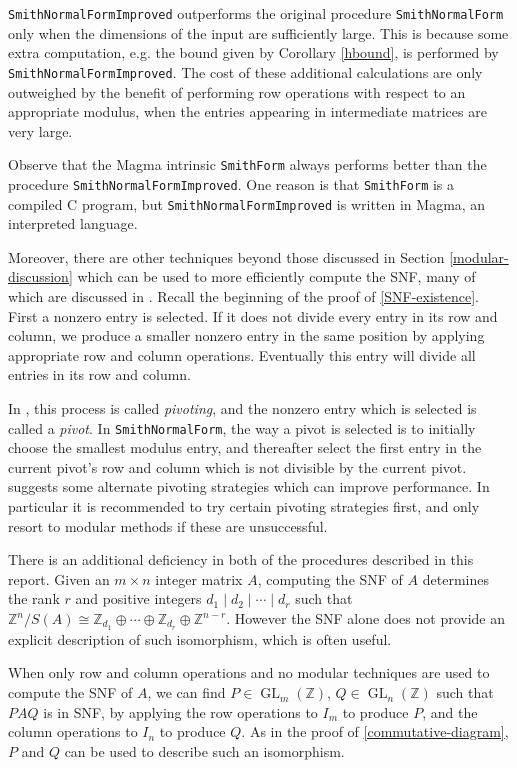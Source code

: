 \documentclass[12pt,a4paper,answers]{exam}
\newcommand{\Z}{\mathbb{Z}}
\DeclareMathOperator{\GL}{GL}
\theoremstyle{definition}
\begin{document}
\texttt{SmithNormalFormImproved} outperforms the original procedure \texttt{SmithNormalForm} only when the dimensions of the input are sufficiently large. This is because some extra computation, e.g. the bound given by Corollary \ref{hbound}, is performed by \texttt{SmithNormalFormImproved}. The cost of these additional calculations are only outweighed by the benefit of performing row operations with respect to an appropriate modulus, when the entries appearing in intermediate matrices are very large.

Observe that the {\sc Magma} intrinsic \texttt{SmithForm} always performs better than the procedure \texttt{SmithNormalFormImproved}. One reason is that \texttt{SmithForm} is a compiled C program, but \texttt{SmithNormalFormImproved} is written in {\sc Magma}, an interpreted language.

Moreover, there are other techniques beyond those discussed in Section \ref{modular-discussion} which can be used to more efficiently compute the SNF, many of which are discussed in \cite{havas}. Recall the beginning of the proof of \autoref{SNF-existence}. First a nonzero entry is selected. If it does not divide every entry in its row and column, we produce a smaller nonzero entry in the same position by applying appropriate row and column operations. Eventually this entry will divide all entries in its row and column.

In \cite{havas}, this process is called \emph{pivoting}, and the nonzero entry which is selected is called a \emph{pivot}. In \texttt{SmithNormalForm}, the way a pivot is selected is to initially choose the smallest modulus entry, and thereafter select the first entry in the current pivot's row and column which is not divisible by the current pivot. \cite{havas} suggests some alternate pivoting strategies which can improve performance. In particular it is recommended to try certain pivoting strategies first, and only resort to modular methods if these are unsuccessful.

There is an additional deficiency in both of the procedures described in this report. Given an $m\times n$ integer matrix $A$, computing the SNF of $A$ determines the rank $r$ and positive integers $d_1\mid d_2\mid\cdots\mid d_r$ such that $\Z^n/S(A) \cong \Z_{d_1}\oplus\cdots\oplus\Z_{d_r}\oplus\Z^{n-r}$. However the SNF alone does not provide an explicit description of such isomorphism, which is often useful.

When only row and column operations and no modular techniques are used to compute the SNF of $A$, we can find $P\in\GL_m(\Z)$, $Q\in\GL_n(\Z)$ such that $PAQ$ is in SNF, by applying the row operations to $I_m$ to produce $P$, and the column operations to $I_n$ to produce $Q$. As in the proof of \autoref{commutative-diagram}, $P$ and $Q$ can be used to describe such an isomorphism.
\end{document}
